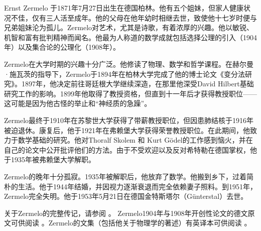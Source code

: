\documentclass[../../../include/open-logic-section]{subfiles}
\begin{document}



Ernst Zermelo 于1871年7月27日出生在德国柏林。他有五个姐妹，但家人健康状况不佳，仅有三人活至成年。他的父母在他年幼时相继去世，致使他十七岁时便与兄弟姐妹沦为孤儿。Zermelo对艺术，尤其是诗歌，有着浓厚的兴趣。他以敏锐、机智和富有批判精神而闻名。他最为人称道的数学成就包括选择公理的引入（1904年）以及集合论的公理化（1908年）。

Zermelo在大学时期的兴趣十分广泛。他修读了物理、数学和哲学课程。在赫尔曼·施瓦茨的指导下，Zermelo于1894年在柏林大学完成了他的博士论文《变分法研究》。1897年，他决定前往哥廷根大学继续深造，在那里他深受David Hilbert基础研究工作的影响。1899年他取得了教授资格，但直到十一年后才获得教授职位——这可能是因为他古怪的举止和“神经质的急躁”。

Zermelo最终于1910年在苏黎世大学获得了带薪教授职位，但因患肺结核于1916年被迫退休。康复后，他于1921年在弗赖堡大学获得荣誉教授职位。在此期间，他致力于数学基础的研究。他对Thoralf Skolem 和 Kurt Gödel的工作感到恼火，并在自己的论文中公开批评他们的方法。由于不受欢迎以及反对希特勒在德国掌权，他于1935年被弗赖堡大学解职。

Zermelo的晚年十分孤寂。1935年被解职后，他放弃了数学。他搬到乡下，过着简朴的生活。他于1944年结婚，并因视力逐渐衰退而完全依赖妻子照料。到1951年，Zermelo完全失明。他于1953年5月21日在德国金特斯塔尔（Günterstal）去世。

\begin{reading}
关于Zermelo的完整传记，请参阅 \citet{Ebbinghaus2015}。
Zermelo1904年与1908年开创性论文的德文原文可供阅读 \citep{Zermelo1904,Zermelo1908}。Zermelo的文集（包括他关于物理学的著述）有英译本可供阅读 \citep{Ebbinghaus2010,Ebbinghaus2013}。
\end{reading}
\end{document}
